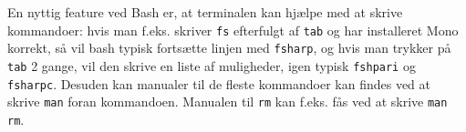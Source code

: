 \documentclass[a4paper]{article}
\begin{document}
En nyttig feature ved Bash er, at terminalen kan hjælpe med at skrive kommandoer: hvis man f.eks. skriver \verb|fs| efterfulgt af \verb|tab| og har installeret Mono korrekt, så vil bash typisk fortsætte linjen med \verb|fsharp|, og hvis man trykker på \verb|tab| 2 gange, vil den skrive en liste af muligheder, igen typisk \verb|fshpari| og \verb|fsharpc|. Desuden kan manualer til de fleste kommandoer kan findes ved at skrive \verb|man| foran kommandoen. Manualen til \verb|rm| kan f.eks. fås ved at skrive \verb|man rm|.




\end{document}
